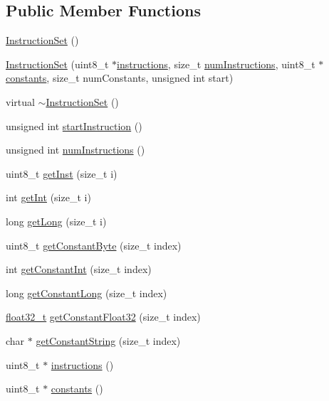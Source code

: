 \subsection*{Public Member Functions}
\begin{DoxyCompactItemize}
\item 
\hyperlink{class_v_m_1_1_instruction_set_a52d8e54cabf468b389c620b21ce60563}{Instruction\-Set} ()
\item 
\hyperlink{class_v_m_1_1_instruction_set_ac918d9a6c6b641456621bb92df003501}{Instruction\-Set} (uint8\-\_\-t $\ast$\hyperlink{class_v_m_1_1_instruction_set_a708ef53450099fae3f61d1a1c3602a45}{instructions}, size\-\_\-t \hyperlink{class_v_m_1_1_instruction_set_af1fa310822cc58d475761c1cb9ef9b3d}{num\-Instructions}, uint8\-\_\-t $\ast$\hyperlink{class_v_m_1_1_instruction_set_abda042ab822309d8dab88606c3cf7e78}{constants}, size\-\_\-t num\-Constants, unsigned int start)
\item 
virtual \hyperlink{class_v_m_1_1_instruction_set_a0c5380b080f3117b9a8c5c1213f6f56b}{$\sim$\-Instruction\-Set} ()
\item 
unsigned int \hyperlink{class_v_m_1_1_instruction_set_a25b73973708552f8fa9b9085345275d9}{start\-Instruction} ()
\item 
unsigned int \hyperlink{class_v_m_1_1_instruction_set_af1fa310822cc58d475761c1cb9ef9b3d}{num\-Instructions} ()
\item 
uint8\-\_\-t \hyperlink{class_v_m_1_1_instruction_set_ace5b6c7eccd511c0cbdcc9ab4a37bcee}{get\-Inst} (size\-\_\-t i)
\item 
int \hyperlink{class_v_m_1_1_instruction_set_a25a498b927a5991bd08b73dc6aa913f8}{get\-Int} (size\-\_\-t i)
\item 
long \hyperlink{class_v_m_1_1_instruction_set_aa75d28a6360445428f36c035d2a06ecf}{get\-Long} (size\-\_\-t i)
\item 
uint8\-\_\-t \hyperlink{class_v_m_1_1_instruction_set_a991a1e003eb1c8c94ba4c916bd1eaa45}{get\-Constant\-Byte} (size\-\_\-t index)
\item 
int \hyperlink{class_v_m_1_1_instruction_set_a270ddf1df2370a0ae5ae5d2c82a97dea}{get\-Constant\-Int} (size\-\_\-t index)
\item 
long \hyperlink{class_v_m_1_1_instruction_set_a0f2b7bd3d04346c3c4775b8a1b4e17f7}{get\-Constant\-Long} (size\-\_\-t index)
\item 
\hyperlink{types_8h_a4611b605e45ab401f02cab15c5e38715}{float32\-\_\-t} \hyperlink{class_v_m_1_1_instruction_set_aee27dbf63468869fe15259a9c4529de1}{get\-Constant\-Float32} (size\-\_\-t index)
\item 
char $\ast$ \hyperlink{class_v_m_1_1_instruction_set_a1ab7146f65458110c9478b6af855551e}{get\-Constant\-String} (size\-\_\-t index)
\item 
uint8\-\_\-t $\ast$ \hyperlink{class_v_m_1_1_instruction_set_a708ef53450099fae3f61d1a1c3602a45}{instructions} ()
\item 
uint8\-\_\-t $\ast$ \hyperlink{class_v_m_1_1_instruction_set_abda042ab822309d8dab88606c3cf7e78}{constants} ()
\end{DoxyCompactItemize}


